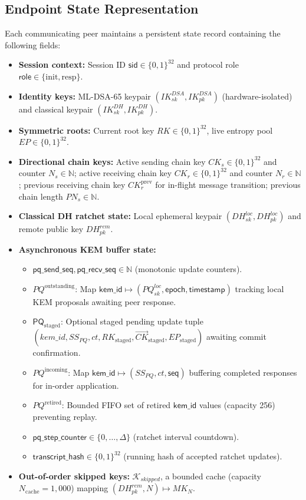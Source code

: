 \documentclass[11pt,a4paper]{article}
\theoremstyle{remark}
\theoremstyle{plain}
\newcommand{\bits}{\{0,1\}}
\begin{document}
\subsection{Endpoint State Representation}
Each communicating peer maintains a persistent state record containing the following fields:
\begin{itemize}
  \item \textbf{Session context:} Session ID $\mathsf{sid} \in \bits^{32}$ and protocol role $\mathsf{role} \in \{\mathrm{init}, \mathrm{resp}\}$.
  \item \textbf{Identity keys:} ML-DSA-65 keypair $(IK^{DSA}_{sk}, IK^{DSA}_{pk})$ (hardware-isolated) and classical keypair $(IK^{DH}_{sk}, IK^{DH}_{pk})$.
  \item \textbf{Symmetric roots:} Current root key $RK \in \bits^{32}$, live entropy pool $EP \in \bits^{32}$.
  \item \textbf{Directional chain keys:} Active sending chain key $CK_s \in \bits^{32}$ and counter $N_s \in \mathbb{N}$; active receiving chain key $CK_r \in \bits^{32}$ and counter $N_r \in \mathbb{N}$; previous receiving chain key $CK_r^{\mathrm{prev}}$ for in-flight message transition; previous chain length $PN_s \in \mathbb{N}$.
  \item \textbf{Classical DH ratchet state:} Local ephemeral keypair $(DH^{loc}_{sk}, DH^{loc}_{pk})$ and remote public key $DH^{rem}_{pk}$.
  \item \textbf{Asynchronous KEM buffer state:}
    \begin{itemize}
      \item $\mathsf{pq\_send\_seq}, \mathsf{pq\_recv\_seq} \in \mathbb{N}$ (monotonic update counters).
      \item $PQ^{\mathrm{outstanding}}$: Map $\mathsf{kem\_id} \mapsto (PQ^{loc}_{sk}, \mathsf{epoch}, \mathsf{timestamp})$ tracking local KEM proposals awaiting peer response.
      \item $\mathsf{PQ}_{\mathrm{staged}}$: Optional staged pending update tuple\\
        $(kem\_id, SS_{PQ}, ct, RK_{\mathrm{staged}}, \vec{CK}_{\mathrm{staged}}, EP_{\mathrm{staged}})$ awaiting commit confirmation.
      \item $PQ^{\mathrm{incoming}}$: Map $\mathsf{kem\_id} \mapsto (SS_{PQ}, ct, \mathsf{seq})$ buffering completed responses for in-order application.
      \item $PQ^{\mathrm{retired}}$: Bounded FIFO set of retired $\mathsf{kem\_id}$ values (capacity 256) preventing replay.
      \item $\mathsf{pq\_step\_counter} \in \{0, \dots, \Delta\}$ (ratchet interval countdown).
      \item $\mathsf{transcript\_hash} \in \bits^{32}$ (running hash of accepted ratchet updates).
    \end{itemize}
  \item \textbf{Out-of-order skipped keys:} $\mathcal{K}_{skipped}$, a bounded cache (capacity $N_{\mathrm{cache}} = 1{,}000$) mapping $(DH^{rem}_{pk}, N) \mapsto MK_N$.
\end{itemize}
\end{document}
